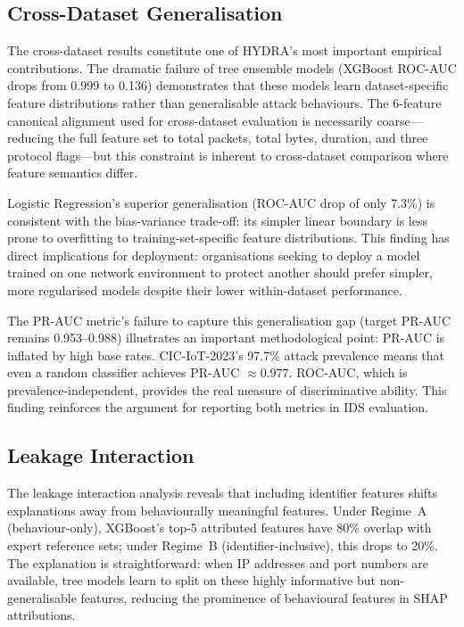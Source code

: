 \documentclass[12pt,a4paper]{report}
\begin{document}
\subsection*{Cross-Dataset Generalisation}

The cross-dataset results constitute one of HYDRA's most important empirical contributions. The dramatic failure of tree ensemble models (XGBoost ROC-AUC drops from 0.999 to 0.136) demonstrates that these models learn dataset-specific feature distributions rather than generalisable attack behaviours. The 6-feature canonical alignment used for cross-dataset evaluation is necessarily coarse---reducing the full feature set to total packets, total bytes, duration, and three protocol flags---but this constraint is inherent to cross-dataset comparison where feature semantics differ.

Logistic Regression's superior generalisation (ROC-AUC drop of only 7.3\%) is consistent with the bias-variance trade-off: its simpler linear boundary is less prone to overfitting to training-set-specific feature distributions. This finding has direct implications for deployment: organisations seeking to deploy a model trained on one network environment to protect another should prefer simpler, more regularised models despite their lower within-dataset performance.

The PR-AUC metric's failure to capture this generalisation gap (target PR-AUC remains 0.953--0.988) illustrates an important methodological point: PR-AUC is inflated by high base rates. CIC-IoT-2023's 97.7\% attack prevalence means that even a random classifier achieves PR-AUC $\approx 0.977$. ROC-AUC, which is prevalence-independent, provides the real measure of discriminative ability. This finding reinforces the argument for reporting both metrics in IDS evaluation.

\subsection*{Leakage Interaction}

The leakage interaction analysis reveals that including identifier features shifts explanations away from behaviourally meaningful features. Under Regime~A (behaviour-only), XGBoost's top-5 attributed features have 80\% overlap with expert reference sets; under Regime~B (identifier-inclusive), this drops to 20\%. The explanation is straightforward: when IP addresses and port numbers are available, tree models learn to split on these highly informative but non-generalisable features, reducing the prominence of behavioural features in SHAP attributions.
\end{document}
